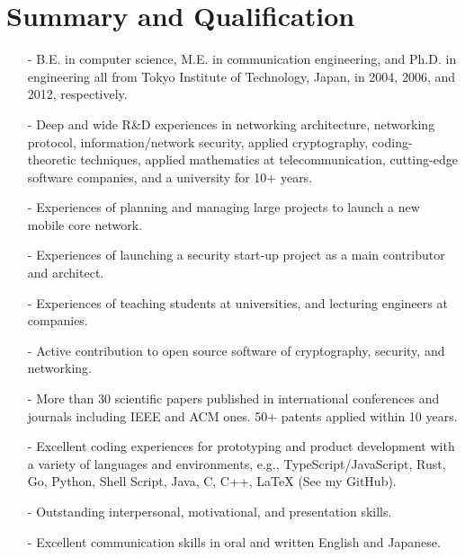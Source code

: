 \section*{Summary and Qualification}
\begin{itemize}
 \item[-] B.E. in computer science, M.E. in communication engineering, and Ph.D. in engineering all from Tokyo Institute of Technology, Japan, in 2004, 2006, and 2012, respectively.
 \item[-] Deep and wide R\&D experiences in networking architecture, networking protocol, information/network security, applied cryptography, coding-theoretic techniques, applied mathematics at telecommunication, cutting-edge software companies, and a university for 10+ years.
 \item[-] Experiences of planning and managing large projects to launch a new mobile core network.
 \item[-] Experiences of launching a security start-up project as a main contributor and architect.
 \item[-] Experiences of teaching students at universities, and lecturing engineers at companies.
 \item[-] Active contribution to open source software of cryptography, security, and networking.
 \item[-] More than 30 scientific papers published in international conferences and journals including IEEE and ACM ones. 50+ patents applied within 10 years.
 \item[-] Excellent coding experiences for prototyping and product development with a variety of languages and environments, e.g., TypeScript/JavaScript, Rust, Go, Python, Shell Script, Java, C, C++, LaTeX (See my GitHub).
 \item[-] Outstanding interpersonal, motivational, and presentation skills.
 \item[-] Excellent communication skills in oral and written English and Japanese.
\end{itemize}
